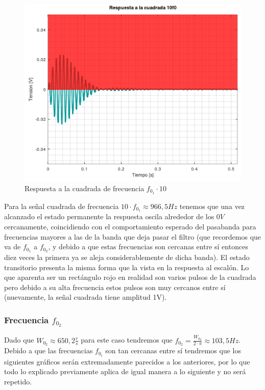 \documentclass[11pt,a4paper]{report}
\begin{document}
\newpage
\begin{figure}[h!]
\includegraphics[scale=1]{RtaCuadradaWo13.png}
\caption{Respuesta a la cuadrada de frecuencia $f_{0_{1}} \cdot 10$}
\end{figure}
\afterpage{\clearpage}

Para la señal cuadrada de frecuencia $10 \cdot f_{0_{1}} \approx 966,5Hz$ tenemos que una vez alcanzado el estado permanente la respuesta oscila alrededor de los $0V$ cercanamente, coincidiendo con el comportamiento esperado del pasabanda para frecuencias mayores a las de la banda que deja pasar el filtro (que recordemos que va de $f_{0_{1}}$ a $f_{0_{2}}$, y debido a que estas frecuencias son cercanas entre sí entonces diez veces la primera ya se aleja considerablemente de dicha banda). El estado transitorio presenta la misma forma que la vista en la respuesta al escalón. Lo que aparenta ser un rectángulo rojo en realidad son varios pulsos de la cuadrada pero debido a su alta frecuencia estos pulsos son muy cercanos entre sí (nuevamente, la señal cuadrada tiene amplitud 1V).

\subsubsection*{Frecuencia $f_{0_{2}}$}

Dado que $W_{0_{2}} \approx 650,2\frac{r}{s}$ para este caso tendremos que $f_{0_{2}} = \frac{W_{0_{2}}}{2 \cdot \pi} \approx 103,5Hz$. Debido a que las frecuencias $f_{0_{i}}$ son tan cercanas entre sí tendremos que los siguientes gráficos serán extremadamente parecidos a los anteriores, por lo que todo lo explicado previamente aplica de igual manera a lo siguiente y no será repetido.
\end{document}
